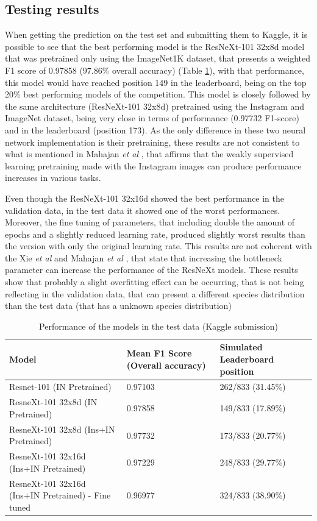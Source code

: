 \documentclass[11pt,onecolumn,titlepage,letterpaper]{article}
\begin{document}
\subsection{Testing results}

When getting the prediction on the test set and submitting them to Kaggle, it is possible to see that the best performing model is the ResNeXt-101 32x8d model that was pretrained only using the ImageNet1K dataset, that presents a weighted F1 score of 0.97858 (97.86\% overall accuracy) (Table \ref{table:test}), with that performance, this model would have reached position 149 in the leaderboard, being on the top 20\% best performing models of the competition. This model is closely followed by the same architecture (ResNeXt-101 32x8d) pretrained using the Instagram and ImageNet dataset, being very close in terms of performance (0.97732 F1-score) and in the leaderboard (position 173). As the only difference in these two neural network implementation is their pretraining, these results are not consistent to what is mentioned in Mahajan \textit{et al} \cite{Mahajan2018}, that affirms that the weakly supervised learning pretraining made with the Instagram images can produce performance increases in various tasks.

Even though the ResNeXt-101 32x16d showed the best performance in the validation data, in the test data it showed one of the worst performances. Moreover, the fine tuning of parameters, that including double the amount of epochs and a slightly reduced learning rate, produced slightly worst results than the version with only the original learning rate. This results are not coherent with the Xie \textit{et al}  \cite{Xie2017} and Mahajan \textit{et al} \cite{Mahajan2018}, that state that increasing the bottleneck parameter can increase the performance of the ResNeXt models. These results show that probably a slight overfitting effect can be occurring, that is not being reflecting in the validation data, that can present a different species distribution than the test data (that has a unknown species distribution) 

\begin{table}[h]
	\begin{center}
		\begin{tabular}{|p{9.1cm}|p{2.8cm}|p{2.8cm}|}
			\hline
			Model & Mean F1 Score (Overall accuracy) & Simulated Leaderboard position\\
			\hline\hline
			Resnet-101 (IN Pretrained) & 0.97103 & 262/833 (31.45\%) \\
			ResneXt-101 32x8d (IN Pretrained) & 0.97858 & 149/833 (17.89\%)  \\
			ResneXt-101 32x8d (Ins+IN Pretrained) & 0.97732 & 173/833 (20.77\%)   \\
			ResneXt-101 32x16d (Ins+IN Pretrained) & 0.97229 & 248/833 (29.77\%) \\
			ResneXt-101 32x16d (Ins+IN Pretrained) - Fine tuned & 0.96977 & 324/833 (38.90\%) \\
			\hline
		\end{tabular}
	\end{center}
	\caption{Performance of the models in the test data (Kaggle submission)}
	\label{table:test}
\end{table}
\end{document}
